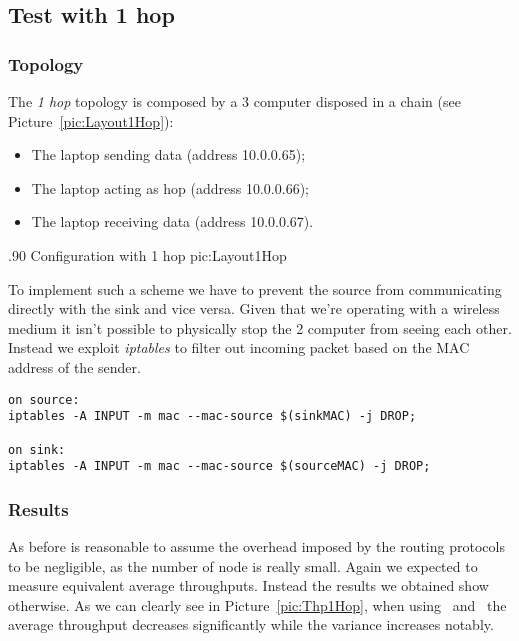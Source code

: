 \subsection{Test with 1 hop}
\subsubsection{Topology}
        The \emph{1 hop} topology is composed by a 3 computer disposed
        in a chain (see Picture~\ref{pic:Layout1Hop}):
        \begin{itemize}
        \item   The laptop sending data (address 10.0.0.65);
        \item   The laptop acting as hop (address 10.0.0.66);
        \item   The laptop receiving data (address 10.0.0.67).
        \end{itemize}

                {.90\columnwidth}
                {Configuration with 1 hop}
                {pic:Layout1Hop}

        To implement such a scheme we have to prevent  the source
        from communicating directly with the sink and vice versa. Given
        that we're operating with a wireless medium it isn't possible
        to physically stop the 2 computer from seeing each
        other. Instead we exploit \emph{iptables} to filter out incoming
        packet based on the MAC address of the sender.

        \begin{verbatim}
on source:
iptables -A INPUT -m mac --mac-source $(sinkMAC) -j DROP;

on sink:
iptables -A INPUT -m mac --mac-source $(sourceMAC) -j DROP;
    \end{verbatim}

\subsubsection{Results}
      As before is reasonable to assume the overhead imposed by
      the routing protocols to be negligible, as the number of node is
      really small. Again we expected to measure equivalent average
      throughputs. Instead the results we obtained show otherwise.
      As we can clearly see in  Picture~\ref{pic:Thp1Hop}, when using
      \batman\ and \olsr\, the average
      throughput decreases significantly while the variance increases notably.

